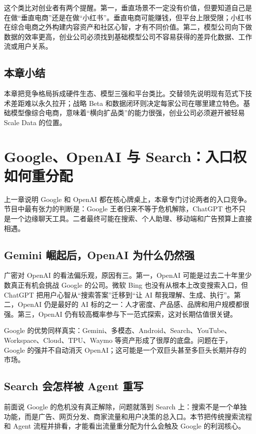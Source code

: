 \documentclass[a4paper]{article}
\begin{document}
这个类比对创业者有两个提醒。第一，垂直场景不一定没有价值，但要知道自己是在做“垂直电商”还是在做“小红书”。垂直电商可能赚钱，但平台上限受限；小红书在综合电商之外构建内容资产和社区心智，才有不同价值。第二，模型公司向下做数据的效率更高，创业公司必须找到基础模型公司不容易获得的差异化数据、工作流或用户关系。

\subsection{本章小结}

本章把竞争格局拆成硬件生态、模型三强和平台类比。交替领先说明现有范式下技术差距难以永久拉开；战略 Beta 和数据闭环则决定每家公司在哪里建立特色。基础模型像综合电商，意味着“横向扩品类”的能力很强，创业公司必须避开被轻易 Scale Data 的位置。

\section{Google、OpenAI 与 Search：入口权如何重分配}

上一章说明 Google 和 OpenAI 都在核心牌桌上，本章专门讨论两者的入口竞争。节目中最有张力的判断是：Google 王者归来不等于危机解除，ChatGPT 也不只是一个边缘聊天工具。二者最终可能在搜索、个人助理、移动端和广告预算上直接相遇。

\subsection{Gemini 崛起后，OpenAI 为什么仍然强}

广密对 OpenAI 的看法偏乐观，原因有三。第一，OpenAI 可能是过去二十年里少数真正有机会挑战 Google 的公司。微软 Bing 也没有从根本上改变搜索入口，但 ChatGPT 把用户心智从“搜索答案”迁移到“让 AI 帮我理解、生成、执行”。第二，OpenAI 仍是最好的 AI 标的之一：人才密度、产品感、品牌和用户规模都很强。第三，OpenAI 仍有较高概率参与下一范式探索，这对长期估值很关键。

Google 的优势同样真实：Gemini、多模态、Android、Search、YouTube、Workspace、Cloud、TPU、Waymo 等资产形成了很厚的底盘。问题在于，Google 的强并不自动消灭 OpenAI；这可能是一个双巨头甚至多巨头长期并存的市场。

\subsection{Search 会怎样被 Agent 重写}

前面说 Google 的危机没有真正解除，问题就落到 Search 上：搜索不是一个单独功能，而是广告、网页分发、商家流量和用户决策的总入口。本节把传统搜索流程和 Agent 流程并排看，才能看出流量重分配为什么会触及 Google 的利润核心。
\end{document}
